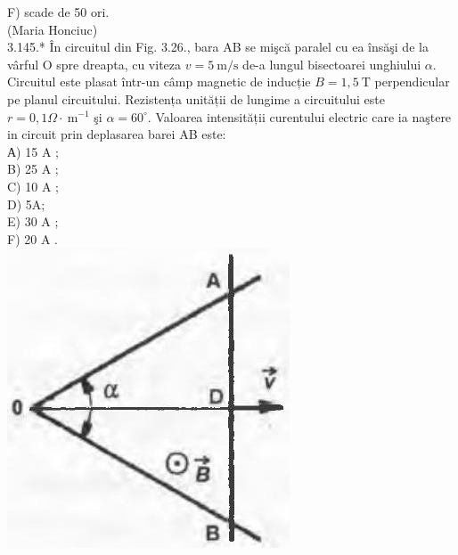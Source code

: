 \documentclass[10pt]{article}
\begin{document}
F) scade de 50 ori.\\
(Maria Honciuc)\\
3.145.* În circuitul din Fig. 3.26., bara AB se mişcă paralel cu ea însăşi de la vârful O spre dreapta, cu viteza $v=5 \mathrm{~m} / \mathrm{s}$ de-a lungul bisectoarei unghiului $\alpha$. Circuitul este plasat într-un câmp magnetic de inducție $B=1,5 \mathrm{~T}$ perpendicular pe planul circuitului. Rezistența unității de lungime a circuitului este $r=0,1 \Omega \cdot \mathrm{~m}^{-1}$ şi $\alpha=60^{\circ}$. Valoarea intensității curentului electric care ia naştere in circuit prin deplasarea barei AB este:\\
А) 15 A ;\\
B) 25 A ;\\
C) 10 A ;\\
D) 5A;\\
E) 30 A ;\\
F) 20 A .\\
\includegraphics[max width=\textwidth, center]{2025_07_01_5b3ff9fa0d508c8e9f17g-175}
\end{document}
